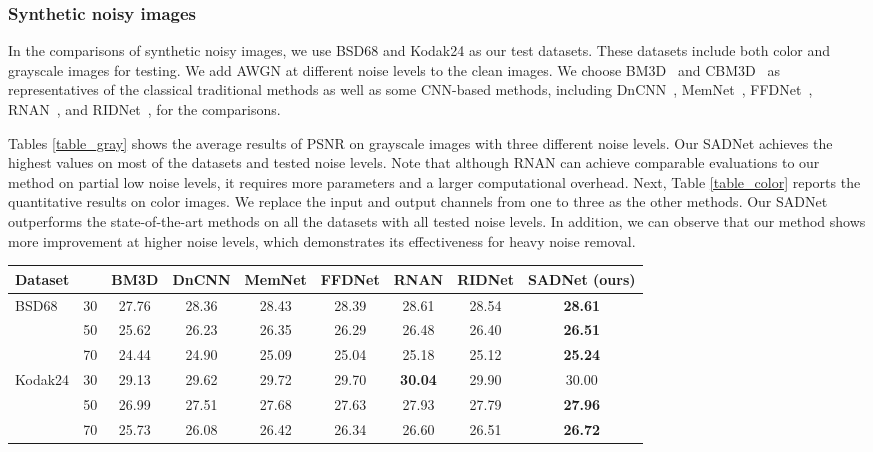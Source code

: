 \documentclass[runningheads]{llncs}
\begin{document}
\subsubsection{Synthetic noisy images}

In the comparisons of synthetic noisy images, we use BSD68 and Kodak24 as our test datasets. These datasets include both color and grayscale images for testing. We add AWGN at different noise levels to the clean images. We choose BM3D~\cite{dabov2007image} and  CBM3D~\cite{dabov2007color} as representatives of the classical traditional methods as well as some CNN-based methods, including DnCNN~\cite{zhang2017beyond}, MemNet~\cite{tai2017memnet}, FFDNet~\cite{zhang2018ffdnet}, RNAN~\cite{zhang2019residual}, and  RIDNet~\cite{anwar2019real}, for the comparisons.

Tables \ref{table_gray} shows the average results of PSNR on grayscale images with three different noise levels. Our SADNet  achieves the highest values on most of the datasets and tested noise levels. Note that although RNAN can achieve comparable evaluations to our method on partial low noise levels, it requires more parameters and a larger computational overhead. Next, Table \ref{table_color} reports the quantitative results on color images. We replace the input and output channels from one to three as the other methods. Our SADNet outperforms the state-of-the-art methods on all the datasets with all tested noise levels. In addition, we can observe that our method shows more improvement at higher noise levels, which demonstrates its effectiveness for heavy noise removal. 

\begin{table*}
\setlength{\tabcolsep}{2pt}
\begin{center}
\caption{Average PSNR(dB) results on synthetic \textbf{grayscale} noisy images}
\label{table_gray}
\begin{tabular}{lcccccccc}
\hline
Dataset &  & BM3D & DnCNN & MemNet & FFDNet & RNAN & RIDNet & SADNet (ours) \\
\hline\hline
\multirow{2}{*}{BSD68} & 30 & 27.76 & 28.36 & 28.43 & 28.39 & 28.61 & 28.54 & \textbf{28.61}\\
~ & 50 & 25.62 & 26.23 & 26.35 & 26.29 & 26.48 & 26.40 & \textbf{26.51}\\
~ & 70 & 24.44 & 24.90 & 25.09 & 25.04 & 25.18 & 25.12 & \textbf{25.24}\\
\hline
\multirow{2}{*}{Kodak24} & 30 & 29.13 & 29.62 & 29.72 & 29.70 & \textbf{30.04} & 29.90 & 30.00\\
~ & 50 & 26.99 & 27.51 & 27.68 & 27.63 & 27.93 & 27.79 & \textbf{27.96}\\
~ & 70 & 25.73 & 26.08 & 26.42 & 26.34 & 26.60 & 26.51 & \textbf{26.72}\\
\hline
\end{tabular}
\end{center}
\end{table*}
\end{document}
